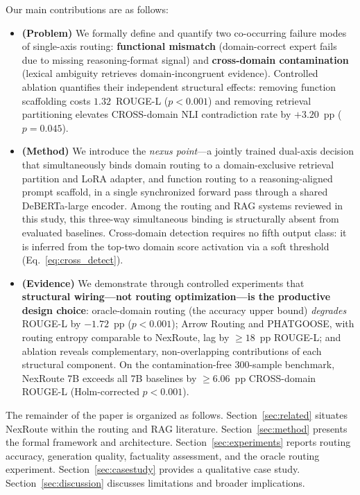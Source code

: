 \documentclass[a4paper,fleql,doubleblind]{cas-sc}
\begin{document}
Our main contributions are as follows:
\begin{itemize}
    \item \textbf{(Problem)} We formally define and quantify two co-occurring
    failure modes of single-axis routing: \textbf{functional mismatch}
    (domain-correct expert fails due to missing reasoning-format signal) and
    \textbf{cross-domain contamination} (lexical ambiguity retrieves
    domain-incongruent evidence). Controlled ablation quantifies their independent
    structural effects: removing function scaffolding costs $1.32$~ROUGE-L
    ($p{<}0.001$) and removing retrieval partitioning elevates CROSS-domain NLI
    contradiction rate by $+3.20$~pp ($p{=}0.045$).

    \item \textbf{(Method)} We introduce the \emph{nexus point}---a jointly trained
    dual-axis decision that simultaneously binds domain routing to a domain-exclusive
    retrieval partition and LoRA adapter, and function routing to a reasoning-aligned
    prompt scaffold, in a single synchronized forward pass through a shared
    DeBERTa-large encoder. Among the routing and RAG systems reviewed in this study,
    this three-way simultaneous binding is structurally absent from evaluated baselines.
    Cross-domain detection requires no fifth output class: it is inferred from
    the top-two domain score activation via a soft threshold
    (Eq.~\ref{eq:cross_detect}).

    \item \textbf{(Evidence)} We demonstrate through controlled experiments that
    \textbf{structural wiring---not routing optimization---is the productive design choice}:
    oracle-domain routing (the accuracy upper bound) \emph{degrades} ROUGE-L by
    $-1.72$~pp ($p{<}0.001$); Arrow Routing and PHATGOOSE, with routing entropy
    comparable to NexRoute, lag by ${\geq}18$~pp ROUGE-L; and ablation reveals
    complementary, non-overlapping contributions of each structural component.
    On the contamination-free 300-sample benchmark, NexRoute 7B exceeds all 7B
    baselines by ${\geq}6.06$~pp CROSS-domain ROUGE-L
    (Holm-corrected $p{<}0.001$).
\end{itemize}

The remainder of the paper is organized as follows.
Section~\ref{sec:related} situates NexRoute within the routing and RAG literature.
Section~\ref{sec:method} presents the formal framework and architecture.
Section~\ref{sec:experiments} reports routing accuracy, generation quality, factuality
assessment, and the oracle routing experiment.
Section~\ref{sec:casestudy} provides a qualitative case study.
Section~\ref{sec:discussion} discusses limitations and broader implications.
\end{document}

